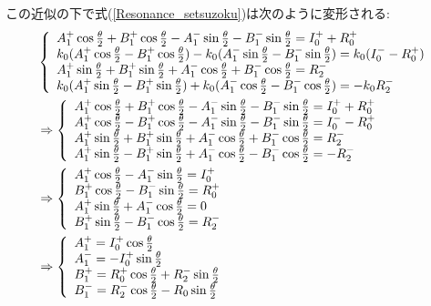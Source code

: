 この近似の下で式(\ref{Resonance_setsuzoku})は次のように変形される:
\begin{align}
&\left\{\begin{array}{l}
A_1^+ \cos \frac{\theta}{2} +B_1^+\cos \frac{\theta}{2} -A_1^-\sin\frac{\theta}{2} -B_1^-\sin\frac{\theta}{2} = I_0^+ +R_0^+ \\
k_0(A_1^+ \cos \frac{\theta}{2} -B_1^+\cos \frac{\theta}{2} )-k_0(A_1^-\sin\frac{\theta}{2} -B_1^-\sin\frac{\theta}{2} )=k_0(I_0^--R_0^+)\\
A_1^+ \sin \frac{\theta}{2} +B_1^+\sin \frac{\theta}{2} +A_1^-\cos\frac{\theta}{2} +B_1^-\cos\frac{\theta}{2} = R_2^- \\
k_0(A_1^+ \sin \frac{\theta}{2} -B_1^+\sin \frac{\theta}{2}) +k_0(A_1^-\cos\frac{\theta}{2} -B_1^-\cos\frac{\theta}{2}) = -k_0R_2^-
\end{array} \right.  \notag \\
&\Rightarrow \left\{\begin{array}{l}
A_1^+ \cos \frac{\theta}{2} +B_1^+\cos \frac{\theta}{2} -A_1^-\sin\frac{\theta}{2} -B_1^-\sin\frac{\theta}{2} = I_0^+ +R_0^+ \\
A_1^+ \cos \frac{\theta}{2} -B_1^+\cos \frac{\theta}{2} -A_1^-\sin\frac{\theta}{2} -B_1^-\sin\frac{\theta}{2} =I_0^--R_0^+\\
A_1^+ \sin \frac{\theta}{2} +B_1^+\sin \frac{\theta}{2} +A_1^-\cos\frac{\theta}{2} +B_1^-\cos\frac{\theta}{2} = R_2^- \\
A_1^+ \sin \frac{\theta}{2} -B_1^+\sin \frac{\theta}{2} +A_1^-\cos\frac{\theta}{2} -B_1^-\cos\frac{\theta}{2} = -R_2^-
\end{array} \right.  \notag \\
&\Rightarrow \left\{\begin{array}{l}
A_1^+ \cos \frac{\theta}{2} -A_1^-\sin\frac{\theta}{2}= I_0^+ \\
B_1^+\cos \frac{\theta}{2} -B_1^-\sin\frac{\theta}{2} =R_0^+\\
A_1^+ \sin \frac{\theta}{2}+A_1^-\cos\frac{\theta}{2}= 0 \\
B_1^+\sin \frac{\theta}{2} -B_1^-\cos\frac{\theta}{2} = R_2^-
\end{array} \right.  \notag \\
&\Rightarrow \left\{\begin{array}{l}
A_1^+ = I_0^+\cos\frac{\theta}{2} \\
A_1^- =-I_0^+\sin\frac{\theta}{2} \\
B_1^+=R_0^+\cos\frac{\theta}{2}+R_2^-\sin\frac{\theta}{2} \\
B_1^-=R_2^-\cos\frac{\theta}{2}-R_0\sin\frac{\theta}{2}
\end{array} \right. \label{Resonance_1and2}
\end{align}


